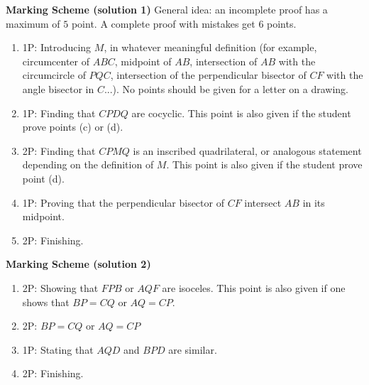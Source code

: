 {\textbf{Marking Scheme (solution 1)}
General idea: an incomplete proof has a maximum of $5$ point. A complete proof with mistakes get 6 points.
\begin{enumerate}
\item 1P: Introducing $M$, in whatever meaningful definition (for example, circumcenter of $ABC$, midpoint of $AB$, intersection of $AB$ with the circumcircle of $PQC$, intersection of the perpendicular bisector of $CF$ with the angle bisector in $C$...). No points should be given for a letter on a drawing.
\item 1P: Finding that $CPDQ$ are cocyclic. This point is also given if the student prove points (c) or (d).
\item 2P: Finding that $CPMQ$ is an inscribed quadrilateral, or analogous statement depending on the definition of $M$. This point is also given if the student prove point (d).
\item 1P: Proving that the perpendicular bisector of $CF$ intersect $AB$ in its midpoint.
\item 2P: Finishing.
\end{enumerate}

\textbf{Marking Scheme (solution 2)}
\begin{enumerate}
\item 2P: Showing that $FPB$ or $AQF$ are isoceles. This point is also given if one shows that $BP=CQ$ or $AQ=CP$.
\item 2P: $BP=CQ$ or $AQ=CP$
\item 1P: Stating that $AQD$ and $BPD$ are similar.
\item 2P: Finishing.
\end{enumerate}
}